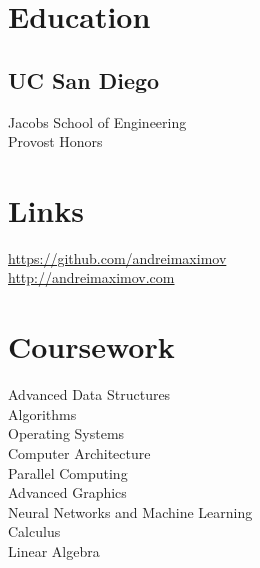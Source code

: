 \documentclass[]{resume}
\begin{document}
%
%
\lastupdated

%
%



%
%

\begin{minipage}[t]{0.33\textwidth}


\section{Education}

\subsection{UC San Diego}
Jacobs School of Engineering \\
Provost Honors \\
\sectionsep


\section{Links}
\href{https://github.com/andreimaximov}{https://github.com/andreimaximov} \\
\href{http://andreimaximov.com}{http://andreimaximov.com} \\
\sectionsep


\section{Coursework}

Advanced Data Structures \\
Algorithms \\
Operating Systems \\
Computer Architecture \\
Parallel Computing \\
Advanced Graphics \\
Neural Networks and Machine Learning \\
Calculus \\
Linear Algebra


\end{minipage}
\end{document}
